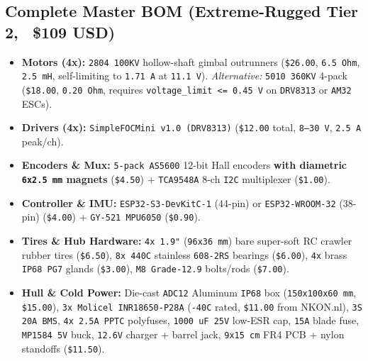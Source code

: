 \documentclass[11pt,a4paper]{article}
\begin{document}
\subsection{Complete Master BOM (Extreme-Rugged Tier 2, ~\$109 USD)}
\begin{itemize}
  \item \textbf{Motors (4x):} \texttt{2804 100KV} hollow-shaft gimbal outrunners (\texttt{\$26.00}, \texttt{6.5 Ohm}, \texttt{2.5 mH}, self-limiting to \texttt{1.71 A} at \texttt{11.1 V}). \textit{Alternative:} \texttt{5010 360KV} 4-pack (\texttt{\$18.00}, \texttt{0.20 Ohm}, requires \texttt{voltage\_limit <= 0.45 V} on \texttt{DRV8313} or \texttt{AM32} ESCs).
  \item \textbf{Drivers (4x):} \texttt{SimpleFOCMini v1.0 (DRV8313)} (\texttt{\$12.00} total, \texttt{8–30 V}, \texttt{2.5 A} peak/ch).
  \item \textbf{Encoders \& Mux:} \texttt{5-pack AS5600} 12-bit Hall encoders \textbf{with diametric \texttt{6x2.5 mm} magnets} (\texttt{\$4.50}) + \texttt{TCA9548A} 8-ch \texttt{I2C} multiplexer (\texttt{\$1.00}).
  \item \textbf{Controller \& IMU:} \texttt{ESP32-S3-DevKitC-1} (44-pin) or \texttt{ESP32-WROOM-32} (38-pin) (\texttt{\$4.00}) + \texttt{GY-521 MPU6050} (\texttt{\$0.90}).
  \item \textbf{Tires \& Hub Hardware:} \texttt{4x 1.9"} (\texttt{96x36 mm}) bare super-soft RC crawler rubber tires (\texttt{\$6.50}), \texttt{8x 440C} stainless \texttt{608-2RS} bearings (\texttt{\$6.00}), \texttt{4x} brass \texttt{IP68 PG7} glands (\texttt{\$3.00}), \texttt{M8 Grade-12.9} bolts/rods (\texttt{\$7.00}).
  \item \textbf{Hull \& Cold Power:} Die-cast \texttt{ADC12} Aluminum \texttt{IP68} box (\texttt{150x100x60 mm}, \texttt{\$15.00}), \texttt{3x Molicel INR18650-P28A} (\texttt{-40C} rated, \texttt{\$11.00} from NKON.nl), \texttt{3S 20A BMS}, \texttt{4x 2.5A PPTC} polyfuses, \texttt{1000 uF 25V} low-ESR cap, \texttt{15A} blade fuse, \texttt{MP1584 5V} buck, \texttt{12.6V} charger + barrel jack, \texttt{9x15 cm} FR4 PCB + nylon standoffs (\texttt{\$11.50}).
\end{itemize}
\end{document}
